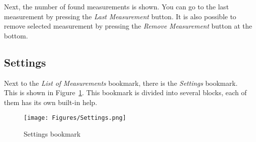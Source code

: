 \documentclass[a4paper,11pt,oneside]{report}
\theoremstyle{named}
\begin{document}
Next, the number of found measurements is shown. You can go to the last
measurement by pressing the \textit{Last Measurement} button. It is also
possible to remove selected measurement by pressing the \textit{Remove
Measurement} button at the bottom.

\subsection{Settings}
\label{sec:Settings}

Next to the \textit{List of Measurements} bookmark, there is the
\textit{Settings} bookmark. This is shown in Figure~\ref{fig:Settings}. This
bookmark is divided into several blocks, each of them has its own built-in help. 

\begin{figure}[t]
  \centering
  \texttt{[image: Figures/Settings.png]}
  \caption{Settings bookmark}
  \label{fig:Settings}
\end{figure}
\end{document}
